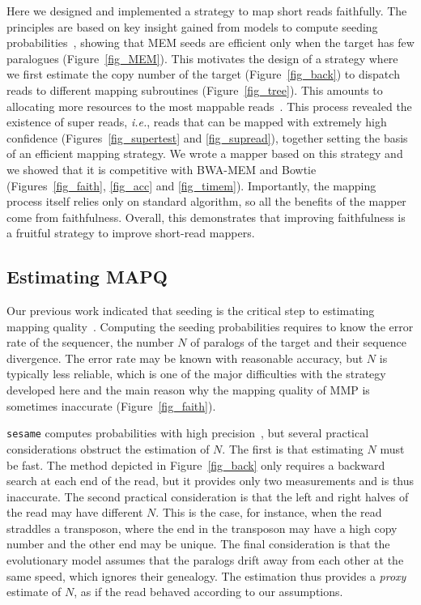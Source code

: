 \documentclass[a4,center,fleqn]{NAR}
\begin{document}
Here we designed and implemented a strategy to map short reads faithfully.
The principles are based on key insight gained from models to compute
seeding probabilities~\cite{Filion619155}, showing that MEM seeds are
efficient only when the target has few paralogues (Figure~\ref{fig_MEM}).
This motivates the design of a strategy where we first estimate the copy
number of the target (Figure~\ref{fig_back}) to dispatch reads to
different mapping subroutines (Figure~\ref{fig_tree}). This amounts to
allocating more resources to the most mappable reads~\cite{pmid22276185}.
This process revealed the existence of super reads, \textit{i.e.}, reads
that can be mapped with extremely high confidence
(Figures~\ref{fig_supertest} and \ref{fig_supread}), together setting the
basis of an efficient mapping strategy. We wrote a mapper based on this
strategy and we showed that it is competitive with BWA-MEM and Bowtie
(Figures~\ref{fig_faith}, \ref{fig_acc} and \ref{fig_timem}). Importantly,
the mapping process itself relies only on standard algorithm, so all the
benefits of the mapper come from faithfulness. Overall, this demonstrates
that improving faithfulness is a fruitful strategy to improve short-read
mappers.


\subsection{Estimating MAPQ}

Our previous work indicated that seeding is the critical step to
estimating mapping quality~\cite{Filion619155}. Computing the seeding
probabilities requires to know the error rate of the sequencer, the number
$N$ of paralogs of the target and their sequence divergence. The error
rate may be known with reasonable accuracy, but $N$ is typically less
reliable, which is one of the major difficulties with the strategy
developed here and the main reason why the mapping quality of MMP is
sometimes inaccurate (Figure~\ref{fig_faith}).

\texttt{sesame} computes probabilities with high
precision~\cite{Filion619155}, but several practical considerations
obstruct the estimation of $N$. The first is that estimating $N$ must be
fast. The method depicted in Figure~\ref{fig_back} only requires a
backward search at each end of the read, but it provides only two
measurements and is thus inaccurate. The second practical consideration is
that the left and right halves of the read may have different $N$. This is
the case, for instance, when the read straddles a transposon, where the
end in the transposon may have a high copy number and the other end may be
unique. The final consideration is that the evolutionary model assumes
that the paralogs drift away from each other at the same speed, which
ignores their genealogy. The estimation thus provides a \emph{proxy}
estimate of $N$, as if the read behaved according to our assumptions.
\end{document}
